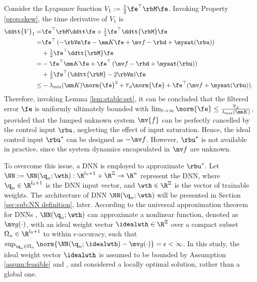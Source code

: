 \documentclass[letterpaper, journal]{IEEEtran}
\begin{document}
Consider the Lyapunov function $V_1:= \tfrac{1}{2}\fe^\top \rbM\fe$. 
Invoking Property \ref{prop:skew}, the time derivative of $V_1$ is
\begin{equation}
    \begin{aligned}
        \ddtt{V}_1
        =&
        \fe^\top \rbM \ddtt \fe
        +
        \tfrac{1}{2}\fe^\top \ddtt{\rbM}\fe
        \\
        =&
        \fe^\top 
        \left(
            -\rbVm \fe -\mm K \fe + \mv f
            -\rbd + \mysat(\rbu)
        \right)
        \\
        &
        +
        \tfrac{1}{2}
        \fe^\top \ddtt{\rbM}\fe
        \\
        =&
        -
        \fe^\top \mm K \fe 
        +
        \fe^\top 
        \left(
            \mv f
            -\rbd
            +\mysat(\rbu)
        \right)
        \\
        &
        +
        \tfrac{1}{2}
        \fe^\top(\ddtt{\rbM}- 2\rbVm)\fe
        \\
        \le&
        -\lambda_{\min}(\mm K)\norm{\fe}^2
        +
        \overline\tau_d\norm{\fe}
        +
        \fe^\top (\mv f+\mysat(\rbu))
        .
    \end{aligned}
    \label{eq:lya1:dot1}
\end{equation} 
Therefore, invoking Lemma \ref{lem:stable:set}, it can be concluded that the filtered error $\fe$ is uniformly ultimately bounded with $\lim_{t\to\infty}\norm{\fe}\le\tfrac{\overline\tau_d}{\lambda_{\min}(\mm K)}$, provided that the lumped unknown system $\mv{f}$ can be perfectly cancelled by the control input $\rbu$, neglecting the effect of input saturation.
Hence, the ideal control input $\rbu^*$ can be designed as $-\mv f$.
However, $\rbu^*$ is not available in practice, since the system dynamics encapsulated in $\mv f$ are unknown.

To overcome this issue, a DNN is employed to approximate $\rbu^*$.
Let $\NN:=\NN({\q}_n;\wth): \R^{l_0+1}\times\R^{\Xi}\to\R^{n}$ represent the DNN, where ${\q}_n\in\R^{l_0+1}$ is the DNN input vector, and $\wth\in\R^{\Xi}$ is the vector of trainable weights.
The architecture of DNN $\NN({\q}_n;\wth)$ will be presented in Section \ref{sec:sub:NN definition}, later.
According to the universal approximation theorem for DNNs \cite{Kidger:2020aa}, $\NN({\q}_n;\wth)$ can approximate a nonlinear function, denoted as $\mv g(\cdot)$, with an ideal weight vector $\idealwth\in\R^\Xi$ over a compact subset $\Omega_{n}\in\R^{l_0+1}$ to within $\epsilon$-accuracy, such that $\sup_{{\q}_n\in\Omega_{n}}\norm{ \NN({\q}_n;\idealwth) - \mv g(\cdot)} = \epsilon < \infty$.
In this study, the ideal weight vector $\idealwth$ is assumed to be bounded by Assumption \ref{assum:feasible} and \cite[Assum. 1]{Lewis:1996aa}, and considered a locally optimal solution, rather than a global one.
\end{document}
